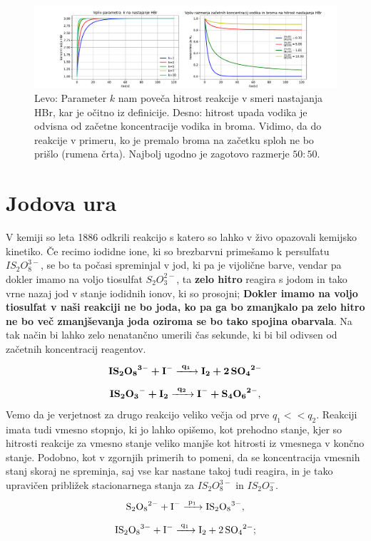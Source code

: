 \documentclass[11pt, a4paper]{article}
\begin{document}
\begin{figure}[H]
\hspace*{-2cm}     
  \includegraphics[width=20cm]{vodikov_vpliv_k.pdf}
  \caption{Levo: Parameter $k$ nam poveča hitrost reakcije v smeri nastajanja HBr, kar je očitno iz definicije. Desno: hitrost upada vodika je odvisna od začetne koncentracije vodika in broma. Vidimo, da do reakcije v primeru, ko je premalo broma na začetku sploh ne bo prišlo (rumena črta). Najbolj ugodno je zagotovo razmerje $50:50$. } 
\end{figure}


\section{Jodova ura}
V kemiji so leta 1886 odkrili reakcijo s katero so lahko v živo opazovali kemijsko kinetiko. Če recimo iodidne ione, ki so brezbarvni primešamo k persulfatu $IS_2O_8^{3-}$, se bo ta počasi spreminjal v jod, ki pa je vijolične barve, vendar pa dokler imamo na voljo tiosulfat $S_2O_3^{2-}$, ta \textbf{zelo hitro} reagira s jodom in tako vrne nazaj jod v stanje iodidnih ionov, ki so prosojni; \textbf{Dokler imamo na voljo tiosulfat v naši reakciji ne bo joda, ko pa ga bo zmanjkalo pa zelo hitro ne bo več zmanjševanja joda oziroma se bo tako spojina obarvala}. Na tak način bi lahko zelo nenatančno umerili čas sekunde, ki bi bil odivsen od začetnih koncentracij reagentov.
\begin{equation}
\textbf{\ce{IS_2O_8^{3-} + I^{-} ->[\ce{q_1}] I_2 + 2SO_4^{2-}}}
\end{equation}
\begin{equation}
 \textbf{\ce{IS_2O_3^{-} + I_2 ->[\ce{q_2}] I^- + S_4O_6^{2-}}}, 
\end{equation}
Vemo da je verjetnost za drugo reakcijo veliko večja od prve $q_1 << q_2$. \newline\newline
Reakciji imata tudi vmesno stopnjo, ki jo lahko opišemo, kot prehodno stanje, kjer so hitrosti reakcije za vmesno stanje veliko manjše kot hitrosti iz vmesnega v končno stanje. Podobno, kot v zgornjih primerih to pomeni, da se koncentracija vmesnih stanj skoraj ne spreminja, saj vse kar nastane takoj tudi reagira, in je tako upravičen približek stacionarnega stanja za $IS_2O_8^{3-}$ in $IS_2O_3^{-}$.
\[
\ce{S_2O_8^{2-} + I^{-} ->[\ce{p_1}] IS_2O_8^{3-}},
\]
\[
\ce{IS_2O_8^{3-} + I^{-} ->[\ce{q_1}] I_2 + 2SO_4^{2-}};
\]
\end{document}
